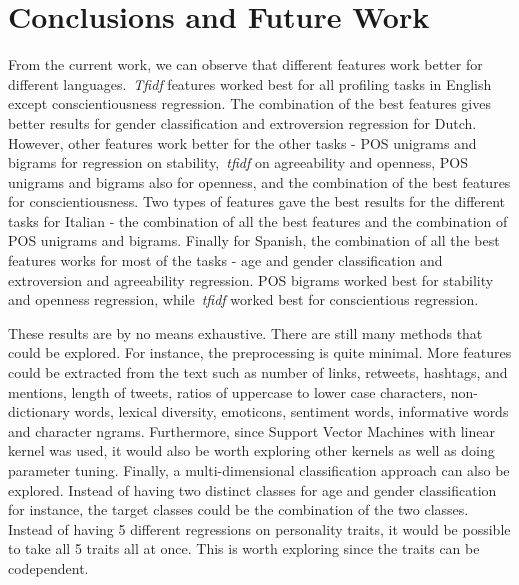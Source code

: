 \documentclass[a4paper]{llncs}
\begin{document}
\section{Conclusions and Future Work}
From the current work, we can observe that different features work better for different languages.~\textit{Tfidf} features worked best for all profiling tasks in English except conscientiousness regression. The combination of the best features gives better results for gender classification and extroversion regression for Dutch. However, other features work better for the other tasks - POS unigrams and bigrams for regression on stability,~\textit{tfidf} on agreeability and openness, POS unigrams and bigrams also for openness, and the combination of the best features for conscientiousness. Two types of features gave the best results for the different tasks for Italian - the combination of all the best features and the combination of POS unigrams and bigrams. Finally for Spanish, the combination of all the best features works for most of the tasks - age and gender classification and extroversion and agreeability regression. POS bigrams worked best for stability and openness regression, while~\textit{tfidf} worked best for conscientious regression.

These results are by no means exhaustive. There are still many methods that could be explored. For instance, the preprocessing is quite minimal. More features could be extracted from the text such as number of links, retweets, hashtags, and mentions, length of tweets, ratios of uppercase to lower case characters, non-dictionary words, lexical diversity, emoticons, sentiment words, informative words and character ngrams. Furthermore, since Support Vector Machines with linear kernel was used, it would also be worth exploring other kernels as well as doing parameter tuning. Finally, a multi-dimensional classification approach can also be explored. Instead of having two distinct classes for age and gender classification for instance, the target classes could be the combination of the two classes. Instead of having 5 different regressions on personality traits, it would be possible to take all 5 traits all at once. This is worth exploring since the traits can be codependent. 
\end{document}
